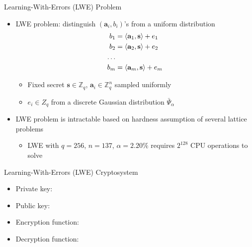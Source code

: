 \begin{frame}{Learning-With-Errors (LWE) Problem}
\begin{itemize}
    \item LWE problem: distinguish $(\mathbf{a}_i,b_i)$'s from a uniform distribution
    \begin{align*}
        b_1 &= \langle\mathbf{a}_1,\mathbf{s}\rangle + e_1\\
        b_2 &= \langle\mathbf{a}_2,\mathbf{s}\rangle + e_2\\
        \ldots\\
        b_m &= \langle\mathbf{a}_m,\mathbf{s}\rangle + e_m
    \end{align*}
    \begin{itemize}
        \item Fixed secret $\mathbf{s}\in \mathbb{Z}_q$, $\mathbf{a}_i\in \mathbb{Z}^n_q$ sampled uniformly
        \item $e_i \in Z_q$ from a discrete Gaussian distribution $\bar{\Psi}_\alpha$
    \end{itemize}
    \item LWE problem is intractable based on hardness assumption of several lattice problems
        \begin{itemize}
            \item LWE with $q=256$, $n = 137$, $\alpha = 2.20\%$ requires $2^{128}$ CPU operations to solve 
        \end{itemize}
\end{itemize}
\end{frame}

\begin{frame}{Learning-With-Errors (LWE) Cryptosystem}
\begin{itemize}
    \item Private key: 
    \item Public key:
    \item Encryption function:
    
    \item Decryption function:
\end{itemize}
\end{frame}

